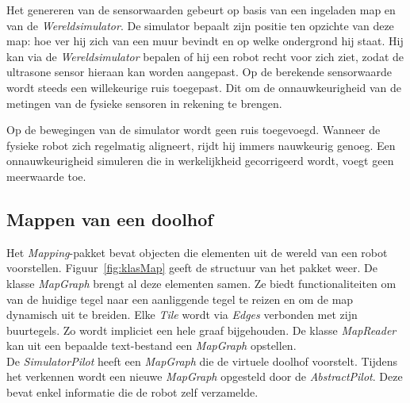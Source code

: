 \documentclass[eind]{penoverslag}
\begin{document}
Het genereren van de sensorwaarden gebeurt op basis van een ingeladen map en van de \textit{Wereldsimulator}. De simulator bepaalt zijn positie ten opzichte van deze map: hoe ver hij zich van een muur bevindt en op welke ondergrond hij staat. Hij kan via de \textit{Wereldsimulator} bepalen of hij een robot recht voor zich ziet, zodat de ultrasone sensor hieraan kan worden aangepast. Op de berekende sensorwaarde wordt steeds een willekeurige ruis toegepast. Dit om de onnauwkeurigheid van de metingen van de fysieke sensoren in rekening te brengen.

Op de bewegingen van de simulator wordt geen ruis toegevoegd. Wanneer de fysieke robot zich regelmatig aligneert, rijdt hij immers nauwkeurig genoeg. Een onnauwkeurigheid simuleren die in werkelijkheid gecorrigeerd wordt, voegt geen meerwaarde toe.

\subsection{Mappen van een doolhof}
\label{ssec:Mapping}
Het \textit{Mapping}-pakket bevat objecten die elementen uit de wereld van een robot voorstellen. Figuur~\ref{fig:klasMap} geeft de structuur van het pakket weer. De klasse \textit{MapGraph} brengt al deze elementen samen. Ze biedt functionaliteiten om van de huidige tegel naar een aanliggende tegel te reizen en om de map dynamisch uit te breiden. Elke \textit{Tile} wordt via \textit{Edges} verbonden met zijn buurtegels. Zo wordt impliciet een hele graaf bijgehouden. De klasse \textit{MapReader} kan uit een bepaalde text-bestand een \textit{MapGraph} opstellen.\\

De \textit{SimulatorPilot} heeft een \textit{MapGraph} die de virtuele doolhof voorstelt. Tijdens het verkennen wordt een nieuwe \textit{MapGraph} opgesteld door de \textit{AbstractPilot}. Deze bevat enkel informatie die de robot zelf verzamelde.

\end{document}
